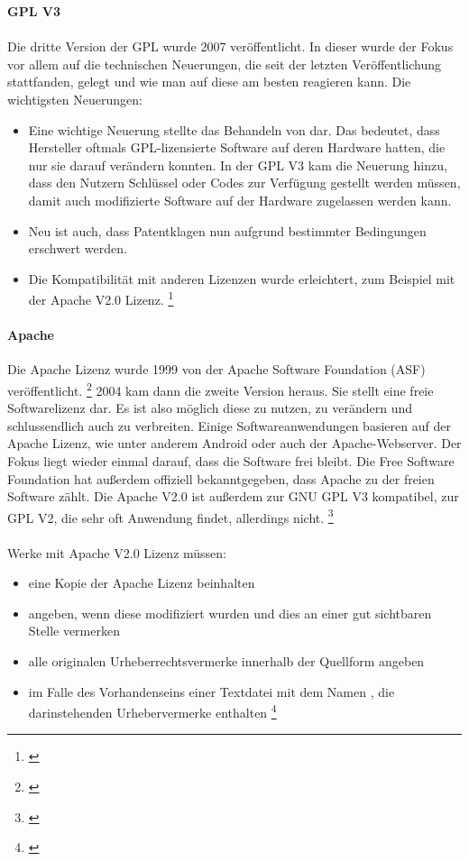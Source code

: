 \documentclass[titlepage,12pt,twoside]{article}
\begin{document}
\hfill \break
\textbf{GPL V3} \\
\\
Die dritte Version der GPL wurde 2007 veröffentlicht. In dieser wurde der Fokus vor allem auf die technischen 
Neuerungen, die seit der letzten Veröffentlichung stattfanden, gelegt und wie man auf diese am besten 
reagieren kann. Die wichtigsten Neuerungen: \\
\begin{itemize}
	\item Eine wichtige Neuerung stellte das Behandeln von  dar. Das bedeutet, dass 
	Hersteller oftmals GPL-lizensierte Software auf deren Hardware hatten, die nur sie darauf verändern 
	konnten. In der GPL V3 kam die Neuerung hinzu, dass den Nutzern Schlüssel oder Codes zur Verfügung 
	gestellt werden müssen, damit auch modifizierte Software auf der Hardware zugelassen werden kann.
	\item Neu ist auch, dass Patentklagen nun aufgrund bestimmter Bedingungen erschwert werden.
	\item Die Kompatibilität mit anderen Lizenzen wurde erleichtert, zum Beispiel mit der Apache V2.0 Lizenz. \footnote{\cite{WikipediaGPL4}}
\end{itemize}
\hfill \break
\paragraph{Apache}
\hfill \break
\hfill \break
Die Apache Lizenz wurde 1999 von der Apache Software Foundation (ASF) veröffentlicht. \footnote{\cite{Apache}} 2004 kam dann die 
zweite Version heraus. Sie stellt eine freie Softwarelizenz dar. Es ist also möglich diese zu nutzen, zu 
verändern und schlussendlich auch zu verbreiten. Einige Softwareanwendungen basieren auf der Apache Lizenz, 
wie unter anderem Android oder auch der Apache-Webserver. Der Fokus liegt wieder einmal darauf, dass die 
Software frei bleibt. Die Free Software Foundation hat außerdem offiziell bekanntgegeben, dass Apache zu der 
freien Software zählt. Die Apache V2.0 ist außerdem zur GNU GPL V3 kompatibel, zur GPL V2, die sehr oft 
Anwendung findet, allerdings nicht. \footnote{\cite{WikipediaApache}} \\
\\
Werke mit Apache V2.0 Lizenz müssen: \\
\begin{itemize}
	\item eine Kopie der Apache Lizenz beinhalten
	\item angeben, wenn diese modifiziert wurden und dies an einer gut sichtbaren Stelle vermerken
	\item alle originalen Urheberrechtsvermerke innerhalb der Quellform angeben
	\item im Falle des Vorhandenseins einer Textdatei mit dem Namen , die 
	darinstehenden Urhebervermerke enthalten \footnote{\cite{WikipediaApache}}
\end{itemize}
\hfill \break
\end{document}
